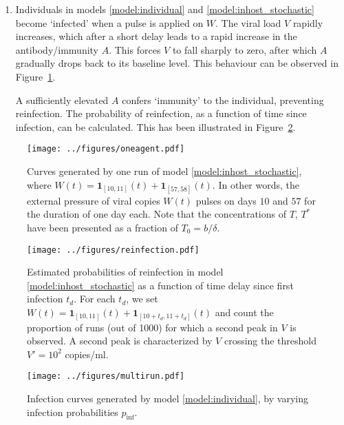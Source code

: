 \documentclass[11pt]{article}
\numberwithin{equation}{subsection}
\begin{document}
\begin{enumerate}
        \item Individuals in models \ref{model:individual} and
        \ref{model:inhost_stochastic} become `infected' when a pulse is
        applied on $W$. The viral load $V$ rapidly increases, which after a
        short delay leads to a rapid increase in the antibody/immunity $A$.
        This forces $V$ to fall sharply to zero, after which $A$ gradually
        drops back to its baseline level. This behaviour can be observed in
        Figure~\ref{fig:oneagent}.

        A sufficiently elevated $A$ confers `immunity' to the individual,
        preventing reinfection. The probability of reinfection, as a function
        of time since infection, can be calculated. This has been illustrated
        in Figure~\ref{fig:reinfection}.
    \end{enumerate}


    \begin{figure}[h!]
    \begin{center}
        \texttt{[image: ../figures/oneagent.pdf]}
    \end{center}
    \caption{
        Curves generated by one run of model \ref{model:inhost_stochastic},
        where $W(t) = \mathbf{1}_{[10, 11]}(t) + \mathbf{1}_{[57, 58]}(t)$. In
        other words, the external pressure of viral copies $W(t)$ pulses on
        days $10$ and $57$ for the duration of one day each. Note that the
        concentrations of $T$, $T^*$ have been presented as a fraction of $T_0
        = b / \delta$.
    }
    \label{fig:oneagent}
    \end{figure}

    \begin{figure}[h!]
    \begin{center}
        \texttt{[image: ../figures/reinfection.pdf]}
    \end{center}
    \caption{
        Estimated probabilities of reinfection in model
        \ref{model:inhost_stochastic} as a function of time delay since first
        infection $t_d$.  For each $t_d$, we set $W(t) = \mathbf{1}_{[10,
        11]}(t) + \mathbf{1}_{[10 + t_d, 11 + t_d]}(t)$ and count the
        proportion of runs (out of 1000) for which a second peak in $V$ is
        observed. A second peak is characterized by $V$ crossing the threshold
        $V' = 10^2$ copies/ml.
    }
    \label{fig:reinfection}
    \end{figure}

    \begin{figure}[h!]
    \begin{center}
        \texttt{[image: ../figures/multirun.pdf]}
    \end{center}
    \caption{
        Infection curves generated by model \ref{model:individual}, by varying
        infection probabilities $p_\text{inf}$.
    }
    \label{fig:multiruns}
    \end{figure}
\end{document}
